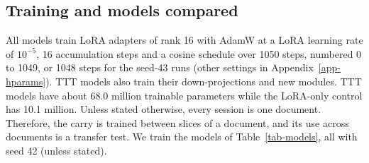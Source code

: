 \documentclass[12pt,a4paper]{report}
\begin{document}
\subsection{Training and models compared}

All models train LoRA adapters \citep{hu2022lora} of rank 16 with AdamW \citep{loshchilov2019decoupled} at a LoRA learning rate of $10^{-5}$, 16 accumulation steps and a cosine schedule \citep{loshchilov2017sgdr} over 1050 steps, numbered 0 to 1049, or 1048 steps for the seed-43 runs (other settings in Appendix~\ref{app-hparams}). TTT models also train their down-projections and new modules. TTT models have about 68.0 million trainable parameters while the LoRA-only control has 10.1 million. Unless stated otherwise, every session is one document. Therefore, the carry is trained between slices of a document, and its use across documents is a transfer test. We train the models of Table~\ref{tab-models}, all with seed 42 (unless stated).
\end{document}
